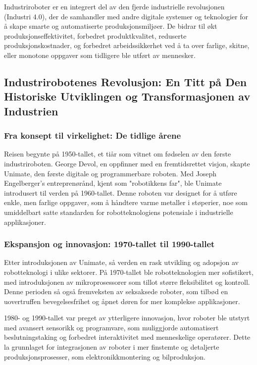 Industriroboter er en integrert del av den fjerde industrielle revolusjonen (Industri 4.0), der de samhandler med andre digitale systemer og teknologier for å skape smarte og automatiserte produksjonsmiljøer. De bidrar til økt produksjonseffektivitet, forbedret produktkvalitet, reduserte produksjonskostnader, og forbedret arbeidssikkerhet ved å ta over farlige, skitne, eller monotone oppgaver som tidligere ble utført av mennesker.

\subsection{Industrirobotenes Revolusjon: En Titt på Den Historiske Utviklingen og Transformasjonen av Industrien}


\subsubsection{Fra konsept til virkelighet: De tidlige årene}

Reisen begynte på 1950-tallet, et tiår som vitnet om fødselen av den første industriroboten. George Devol, en oppfinner med en fremtidsrettet visjon, skapte Unimate, den første digitale og programmerbare roboten. Med Joseph Engelberger's entreprenørånd, kjent som "robotikkens far", ble Unimate introdusert til verden på 1960-tallet. Denne roboten var designet for å utføre enkle, men farlige oppgaver, som å håndtere varme metaller i støperier, noe som umiddelbart satte standarden for robotteknologiens potensiale i industrielle applikasjoner.

\subsubsection{Ekspansjon og innovasjon: 1970-tallet til 1990-tallet}

Etter introduksjonen av Unimate, så verden en rask utvikling og adopsjon av robotteknologi i ulike sektorer. På 1970-tallet ble robotteknologien mer sofistikert, med introduksjonen av mikroprosessorer som tillot større fleksibilitet og kontroll. Denne perioden så også fremveksten av seksaksede roboter, som tilbød en uovertruffen bevegelsesfrihet og åpnet døren for mer komplekse applikasjoner.

1980- og 1990-tallet var preget av ytterligere innovasjon, hvor roboter ble utstyrt med avansert sensorikk og programvare, som muliggjorde automatisert beslutningstaking og forbedret interaktivitet med menneskelige operatører. Dette la grunnlaget for integrasjonen av roboter i mer finstemte og detaljerte produksjonsprosesser, som elektronikkmontering og bilproduksjon.

